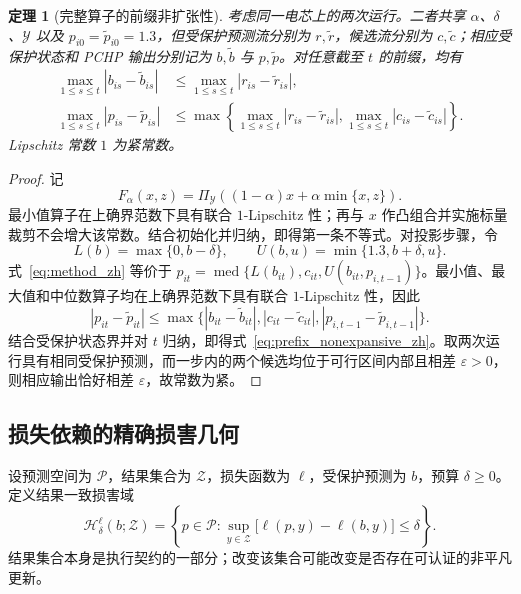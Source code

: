 \documentclass[UTF8,11pt]{ctexart}
\newtheorem{theorem}{定理}
\begin{document}
\begin{theorem}[完整算子的前缀非扩张性]
\label{thm:nonexpansive_zh}
考虑同一电芯上的两次运行。二者共享 $\alpha$、$\delta$、$\mathcal Y$ 以及 $p_{i0}=\widetilde p_{i0}=1.3$，但受保护预测流分别为 $r,\widetilde r$，候选流分别为 $c,\widetilde c$；相应受保护状态和 PCHP 输出分别记为 $b,\widetilde b$ 与 $p,\widetilde p$。对任意截至 $t$ 的前缀，均有
\begin{align}
  \max_{1\leq s\leq t}|b_{is}-\widetilde b_{is}|
  &\leq \max_{1\leq s\leq t}|r_{is}-\widetilde r_{is}|,\\
  \max_{1\leq s\leq t}|p_{is}-\widetilde p_{is}|
  &\leq
  \max\!\left\{
  \max_{1\leq s\leq t}|r_{is}-\widetilde r_{is}|,
  \max_{1\leq s\leq t}|c_{is}-\widetilde c_{is}|
  \right\}.
  \label{eq:prefix_nonexpansive_zh}
\end{align}
Lipschitz 常数 $1$ 为紧常数。
\end{theorem}
\begin{proof}
记
\[
F_\alpha(x,z)=\Pi_{\mathcal Y}\!\left((1-\alpha)x+\alpha\min\{x,z\}\right).
\]
最小值算子在上确界范数下具有联合 $1$-Lipschitz 性；再与 $x$ 作凸组合并实施标量裁剪不会增大该常数。结合初始化并归纳，即得第一条不等式。对投影步骤，令
\[
L(b)=\max\{0,b-\delta\},\qquad
U(b,u)=\min\{1.3,b+\delta,u\}.
\]
式~\eqref{eq:method_zh} 等价于 $p_{it}=\operatorname{med}\{L(b_{it}),c_{it},U(b_{it},p_{i,t-1})\}$。最小值、最大值和中位数算子均在上确界范数下具有联合 $1$-Lipschitz 性，因此
\[
|p_{it}-\widetilde p_{it}|
\leq \max\{|b_{it}-\widetilde b_{it}|,
|c_{it}-\widetilde c_{it}|,
|p_{i,t-1}-\widetilde p_{i,t-1}|\}.
\]
结合受保护状态界并对 $t$ 归纳，即得式~\eqref{eq:prefix_nonexpansive_zh}。取两次运行具有相同受保护预测，而一步内的两个候选均位于可行区间内部且相差 $\varepsilon>0$，则相应输出恰好相差 $\varepsilon$，故常数为紧。
\end{proof}

\subsection{损失依赖的精确损害几何}

设预测空间为 $\mathcal P$，结果集合为 $\mathcal Z$，损失函数为 $\ell$，受保护预测为 $b$，预算 $\delta\geq0$。定义结果一致损害域
\begin{equation}
  \mathcal H^{\ell}_{\delta}(b;\mathcal Z)
  =\left\{p\in\mathcal P:
  \sup_{y\in\mathcal Z}\bigl[\ell(p,y)-\ell(b,y)\bigr]\leq\delta
  \right\}.
  \label{eq:generic_harm_region_zh}
\end{equation}
结果集合本身是执行契约的一部分；改变该集合可能改变是否存在可认证的非平凡更新。
\end{document}
